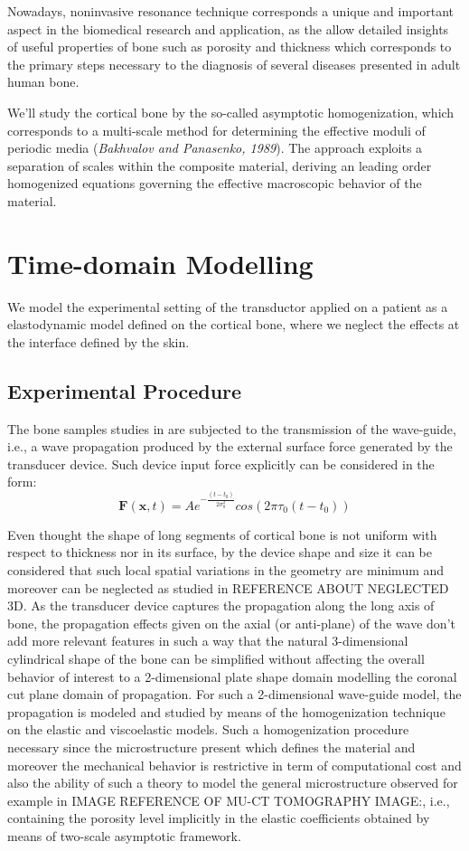 Nowadays, noninvasive resonance technique corresponds a unique and important aspect in the biomedical research and application, as the allow detailed insights of useful properties of bone such as porosity and thickness which corresponds to the primary steps necessary to the diagnosis of several diseases presented in adult human bone.

We'll study the cortical bone by the so-called asymptotic homogenization, which corresponds to a multi-scale method for determining the effective moduli of periodic media (\textit{Bakhvalov and Panasenko, 1989}). The approach exploits a separation of scales within the composite material, deriving an leading order homogenized equations governing the effective macroscopic behavior of the material.\\


\section{Time-domain Modelling}
We model the experimental setting of the transductor applied on a patient as a elastodynamic model defined on the cortical bone, where we neglect the effects at the interface defined by the skin. 
\subsection{Experimental Procedure}
The bone samples studies in \cite{Foiret2014} \cite{Minonzio2018} are subjected to the transmission of the wave-guide, i.e., a wave propagation produced by the external surface force generated by the transducer device. Such device input force explicitly can be considered in the form:
\begin{equation*}
    \mathbf{F}(\mathbf{x},t) = A e^{-\frac{(t-t_0)}{2\sigma_0^2}} cos(2 \pi \tau_0 (t-t_0))
\end{equation*}

Even thought the shape of long segments of cortical bone is not uniform with respect to thickness nor in its surface, by the device shape and size it can be considered that such local spatial variations in the geometry are minimum and moreover can be neglected as studied in REFERENCE ABOUT NEGLECTED 3D.
As the transducer device captures the propagation along the long axis of bone, the propagation effects given on the axial (or anti-plane) of the wave don't add more relevant features \cite{Foiret2014} in such a way that the natural 3-dimensional cylindrical shape of the bone can be simplified without affecting the overall behavior of interest to a 2-dimensional plate shape domain modelling the coronal cut plane domain of propagation.
For such a 2-dimensional wave-guide model, the propagation is modeled and studied by means of the homogenization technique on the elastic and viscoelastic models. Such a homogenization procedure necessary since the microstructure present which defines the material and moreover the mechanical behavior is restrictive in term of computational cost and also the ability of such a theory to model the general microstructure observed for example in IMAGE REFERENCE OF MU-CT TOMOGRAPHY IMAGE:, i.e., containing the porosity level implicitly in the elastic coefficients obtained by means of two-scale asymptotic framework.

